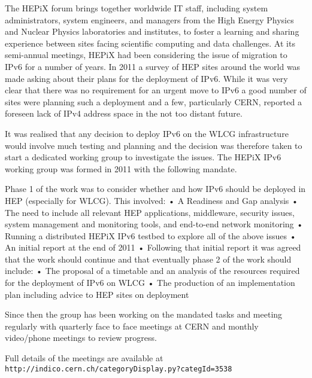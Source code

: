 The HEPiX forum brings together worldwide IT staff, including system administrators, system engineers, and managers from the High Energy Physics and Nuclear Physics laboratories and institutes, to foster a learning and sharing experience between sites facing scientific computing and data challenges. At its semi-annual meetings, HEPiX had been considering the issue of migration to IPv6 for a number of years. In 2011 a survey of HEP sites around the world was made asking about their plans for the deployment of IPv6. While it was very clear that there was no requirement for an urgent move to IPv6 a good number of sites were planning such a deployment and a few, particularly CERN, reported a foreseen lack of IPv4 address space in the not too distant future.

It was realised that any decision to deploy IPv6 on the WLCG infrastructure would involve much testing and planning and the decision was therefore taken to start a dedicated working group to investigate the issues. The HEPiX IPv6 working group was formed in 2011 with the following mandate.

Phase 1 of the work was to consider whether and how IPv6 should be deployed in HEP (especially for WLCG). This involved:
	•	A Readiness and Gap analysis
	•	The need to include all relevant HEP applications, middleware, security issues, system management and monitoring tools, and end-to-end network monitoring
	•	Running a distributed HEPiX IPv6 testbed to explore all of the above issues
	•	An initial report at the end of 2011
	•	
Following that initial report it was agreed that the work should continue and that eventually phase 2 of the work should include:
	•	The proposal of a timetable and an analysis of the resources required for the deployment of IPv6 on WLCG
	•	The production of an implementation plan including advice to HEP sites on deployment

Since then the group has been working on the mandated tasks and meeting regularly with quarterly face to face meetings at CERN and monthly video/phone meetings to review progress. 

Full details of the meetings are available at {\tt http://indico.cern.ch/categoryDisplay.py?categId=3538}


